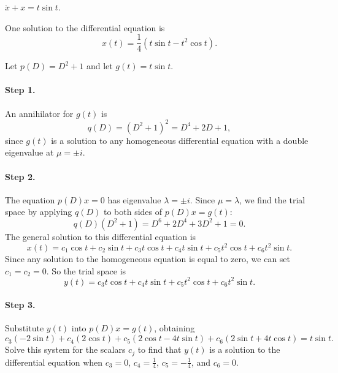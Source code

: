 \documentclass{ximera}
\begin{document}
\begin{exercise}  \label{c12.4.5}
$\ddot{x}+x = t\sin t$.

\begin{solution}
\ans One solution to the differential equation is
\[
x(t) = \frac{1}{4}(t\sin t- t^2\cos t).
\]

\soln Let $p(D) = D^2 + 1$ and let $g(t) = t\sin t$.
\paragraph{Step 1.} An annihilator for $g(t)$ is
\[
q(D) = (D^2 + 1)^2 = D^4 + 2D + 1,
\]
since $g(t)$ is a solution to any homogeneous differential equation
with a double eigenvalue at $\mu = \pm i$.

\paragraph{Step 2.} The equation $p(D)x = 0$ has eigenvalue $\lambda =
\pm i$.  Since $\mu = \lambda$, we find the trial space by applying
$q(D)$ to both sides of $p(D)x = g(t)$:
\[
q(D)(D^2 + 1) = D^6 + 2D^4 + 3D^2 + 1 = 0.
\]
The general solution to this differential equation is
\[
x(t) = c_1\cos t + c_2\sin t + c_3t\cos t + c_4t\sin t + c_5t^2\cos t
+ c_6t^2\sin t.
\]
Since any solution to the homogeneous equation is equal to zero, we can
set $c_1 = c_2 = 0$.  So the trial space is
\[
y(t) = c_3t\cos t + c_4t\sin t + c_5t^2\cos t + c_6t^2\sin t.
\]
\paragraph{Step 3.} Substitute $y(t)$ into $p(D)x = g(t)$, obtaining
\[
c_3(-2\sin t) + c_4(2\cos t) + c_5(2\cos t - 4t\sin t) +
c_6(2\sin t + 4t\cos t) = t\sin t.
\]
Solve this system for the scalars $c_j$ to find that $y(t)$ is a solution
to the differential equation when $c_3 = 0$, $c_4 = \frac{1}{4}$,
$c_5 = -\frac{1}{4}$, and $c_6 = 0$.

\end{solution}
\end{exercise}
\end{document}
